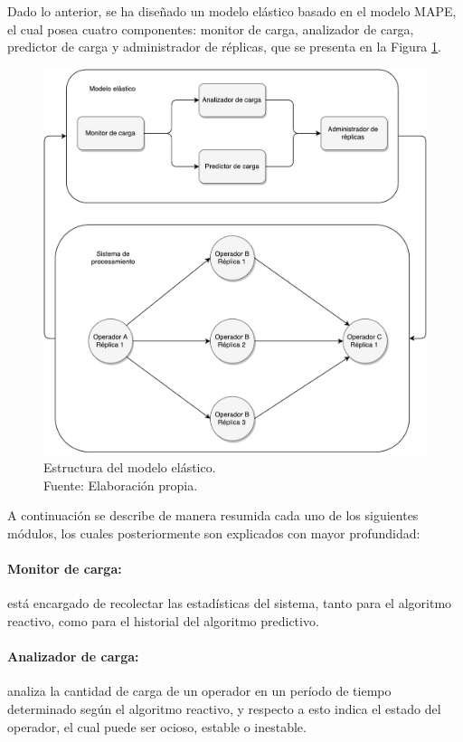 Dado lo anterior, se ha dise\~nado un modelo el\'astico \normalsize{basado en el modelo MAPE}\citep{redbooks2004practical}\normalsize{, el cual posea cuatro componentes}: monitor de carga, analizador de carga, predictor de carga y administrador de r\'eplicas, que se presenta en la Figura \ref{fig:componentesSistemas}.

\begin{figure}[ht!]
  \centering
    \includegraphics[scale=0.5]{images/Diagrama.pdf}
  \caption[Estructura del modelo el\'astico.]{Estructura del modelo el\'astico.\\Fuente: Elaboraci\'on propia.}
  \label{fig:componentesSistemas}
\end{figure}

A continuaci\'on se describe de manera resumida cada uno de los siguientes m\'odulos, los cuales posteriormente son explicados con mayor profundidad:

\paragraph{Monitor de carga:} est\'a encargado de recolectar las estad\'isticas del sistema, tanto para el algoritmo reactivo, como para el historial del algoritmo predictivo.

\paragraph{Analizador de carga:} analiza la cantidad de carga de un operador en un per\'iodo de tiempo determinado seg\'un el algoritmo reactivo, y respecto a esto indica el estado del operador,  el cual puede ser ocioso, estable o inestable.

